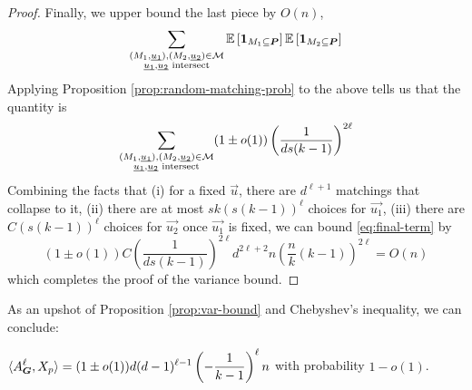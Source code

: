 \begin{proof}
	Finally, we upper bound the last piece by $O(n)$,
	\begin{align}	\label{eq:final-term}
		\sum_{\substack{(M_1,\underline{\smash{u_1}}), (M_2,\underline{\smash{u_2}}) \in \mathcal{M}\\ \underline{\smash{u_1}},\underline{\smash{u_2}}\text{ intersect}}} \operatorname*{\mathbb{E}}\left[\boldsymbol{1}_{M_1\subseteq \boldsymbol{P}}\right]\operatorname*{\mathbb{E}}\left[\boldsymbol{1}_{M_2\subseteq\boldsymbol{P}}\right]
	\end{align}
	Applying Proposition \ref{prop:random-matching-prob} to the above tells us that the quantity is
	\begin{align*}
		\sum_{\substack{(M_1,\underline{\smash{u_1}}), (M_2,\underline{\smash{u_2}}) \in \mathcal{M}\\ \underline{\smash{u_1}},\underline{\smash{u_2}}\text{ intersect}}} (1\pm o(1)) \left(\frac{1}{ds(k-1)}\right)^{2\ell}
	\end{align*}
	Combining the facts that (i) for a fixed $\vec{u}$, there are $d^{\ell+1}$ matchings that collapse to it, (ii) there are at most $sk(s(k-1))^{\ell}$ choices for $\vec{u_1}$, (iii) there are $C(s(k-1))^{\ell}$ choices for $\vec{u_2}$ once $\vec{u_1}$ is fixed, we can bound \eqref{eq:final-term} by
	\[
		(1\pm o(1))C\left(\frac{1}{ds(k-1)}\right)^{2\ell}d^{2\ell+2}n\left(\frac{n}{k}(k-1)\right)^{2\ell} = O(n)
	\]
	which completes the proof of the variance bound.
\end{proof}

As an upshot of Proposition \ref{prop:var-bound} and Chebyshev's inequality, we can conclude:
\begin{theorem}
	$\displaystyle\langle A_{\boldsymbol{G}}^{\ell}, X_p\rangle = (1\pm o(1))d(d-1)^{\ell-1}\left(-\frac{1}{k-1}\right)^{\ell}n$ with probability $1-o(1)$.
\end{theorem}